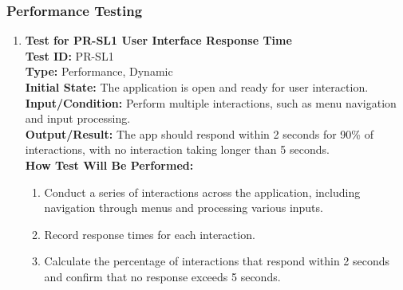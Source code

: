 \documentclass[12pt, titlepage]{article}
\begin{document}
\subsubsection{Performance Testing}
\label{PR}
\begin{enumerate}
    \item \textbf{Test for PR-SL1 User Interface Response Time} \\
      \newline
      \textbf{Test ID:} PR-SL1 \\
      \textbf{Type:} Performance, Dynamic \\
      \textbf{Initial State:} The application is open and ready for user interaction. \\
      \textbf{Input/Condition:} Perform multiple interactions, such as menu navigation and input processing. \\
      \textbf{Output/Result:} The app should respond within 2 seconds for 90\% of interactions, with no interaction taking longer 
      than 5 seconds. \\
      \textbf{How Test Will Be Performed:}
      \begin{enumerate}
          \item Conduct a series of interactions across the application, including navigation through menus and processing various 
          inputs.
          \item Record response times for each interaction.
          \item Calculate the percentage of interactions that respond within 2 seconds and confirm that no response exceeds 5 seconds.
      \end{enumerate}


\end{enumerate}
\end{document}
